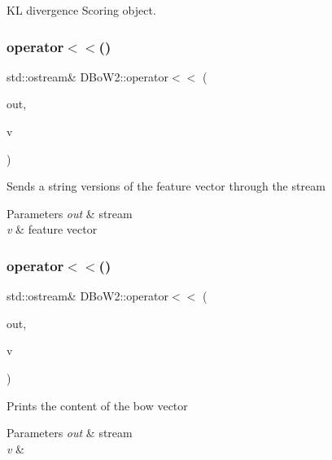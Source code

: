 KL divergence Scoring object. 

\mbox{\label{namespace_d_bo_w2_ac65e2bfb945a77c5294d0300a4fed49c}} 
\subsubsection{\texorpdfstring{operator$<$$<$()}{operator<<()}\hspace{0.1cm}{\footnotesize\ttfamily [1/3]}}
{\footnotesize\ttfamily std\+::ostream\& D\+Bo\+W2\+::operator$<$$<$ (\begin{DoxyParamCaption}\item[{std\+::ostream \&}]{out,  }\item[{const \mbox{\hyperlink{class_d_bo_w2_1_1_feature_vector}{Feature\+Vector}} \&}]{v }\end{DoxyParamCaption})}

Sends a string versions of the feature vector through the stream 
\begin{DoxyParams}{Parameters}
{\em out} & stream \\
\hline
{\em v} & feature vector \\
\hline
\end{DoxyParams}
\mbox{\label{namespace_d_bo_w2_a06d2058b1bde1cdc49f277fec62073e2}} 
\subsubsection{\texorpdfstring{operator$<$$<$()}{operator<<()}\hspace{0.1cm}{\footnotesize\ttfamily [2/3]}}
{\footnotesize\ttfamily std\+::ostream\& D\+Bo\+W2\+::operator$<$$<$ (\begin{DoxyParamCaption}\item[{std\+::ostream \&}]{out,  }\item[{const \mbox{\hyperlink{class_d_bo_w2_1_1_bow_vector}{Bow\+Vector}} \&}]{v }\end{DoxyParamCaption})}

Prints the content of the bow vector 
\begin{DoxyParams}{Parameters}
{\em out} & stream \\
\hline
{\em v} & \\
\hline
\end{DoxyParams}
\mbox{\label{namespace_d_bo_w2_aecdf616fe16d2cf09f521a603b9d43f1}} 
